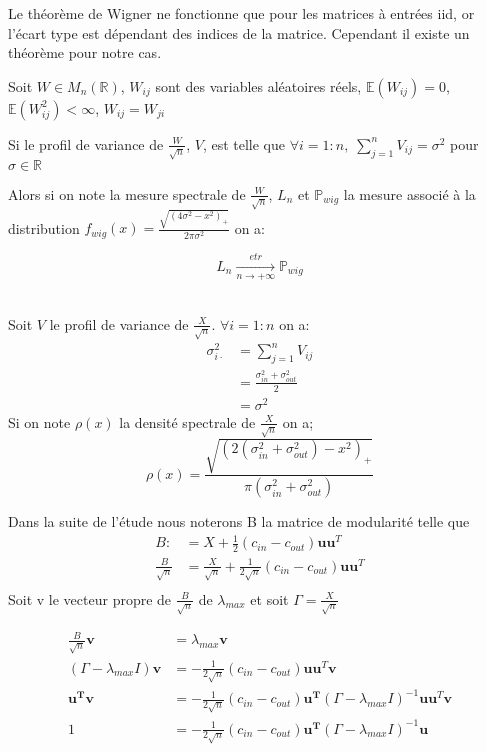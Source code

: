 Le théorème de Wigner ne fonctionne que pour les matrices à entrées iid, or l'écart type est dépendant des indices de la matrice.
Cependant il existe un théorème pour notre cas.
\begin{theorem}\label{th:1}
Soit $W \in M_{n}(\mathbb{R})$, $W_{ij}$ sont des variables aléatoires réels, $\mathbb{E}(W_{ij}) = 0$, $\mathbb{E}(W_{ij}^2) < \infty$, $W_{ij} = W_{ji}$

Si le profil de variance de $\frac{W}{\sqrt{n}}$, $V$, est telle que $\forall i = 1:n , \; \sum_{j=1}^{n}V_{ij} = \sigma^2$ pour $\sigma \in \mathbb{R}$

Alors si on note la mesure spectrale de $\frac{W}{\sqrt{n}}$, $L_{n}$  et $\mathbb{P}_{wig}$ la mesure associé à la distribution $f_{wig}(x)= \frac{\sqrt{(4\sigma^2 - x^2)_+}}{2\pi\sigma^2}$ on a:

\begin{equation}
	L_n\xrightarrow[n \to +\infty]{etr} \mathbb{P}_{wig}\nonumber
\end{equation}\\
\end{theorem}

Soit $V$ le profil de variance de $\frac{X}{\sqrt{n}}$. $\forall i = 1:n$ on a: 
\begin{align*} 
\sigma_{i \cdot}^2 &= \sum_{j=1}^{n}V_{ij}  \\
 		&= \frac{\sigma_{in}^2 + \sigma_{out}^2}{2}  \\
		&=\sigma^2
\end{align*}
Si on note $\rho(x)$ la densité spectrale de $\frac{X}{\sqrt{n}}$ on a;
\begin{equation}
	\rho(x) = \frac{\sqrt{(2(\sigma_{in}^2 + \sigma_{out}^2) - x^2)_+}}{\pi(\sigma_{in}^2 + \sigma_{out}^2)}
\end{equation}

Dans la suite de l'étude nous noterons B la matrice de modularité telle que 
\begin{align*} 
B :&= X + \frac{1}{2}(c_{in} - c_{out})\mathbf{uu}^T \\
\frac{B}{\sqrt{n}} &= \frac{X}{\sqrt{n}} + \frac{1}{2\sqrt{n}}(c_{in} - c_{out})\mathbf{uu}^T\\
\end{align*}
Soit v le vecteur propre de $\frac{B}{\sqrt{n}}$ de $\lambda_{max}$ et soit $\Gamma = \frac{X}{\sqrt{n}}$

\begin{align} 
\frac{B}{\sqrt{n}}\mathbf{v} &= \lambda_{max}\mathbf{v} \nonumber\\
(\Gamma - \lambda_{max}I)\mathbf{v} &= -\frac{1}{2\sqrt{n}}(c_{in} - c_{out})\mathbf{uu}^T \mathbf{v} \nonumber\\
 \mathbf{u^Tv} &= -\frac{1}{2\sqrt{n}}(c_{in} - c_{out})\mathbf{u^T}(\Gamma - \lambda_{max}I)^{-1}\mathbf{uu}^T \mathbf{v} \nonumber\\
 1 &= -\frac{1}{2\sqrt{n}}(c_{in} - c_{out})\mathbf{u^T}(\Gamma - \lambda_{max}I)^{-1}\mathbf{u} \label{eq:3}
\end{align}

